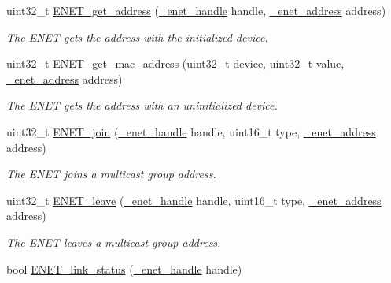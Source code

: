 \begin{DoxyCompactItemize}
uint32\+\_\+t \hyperlink{group__enet__rtcs__adaptor_gaaf87b07918a31d7ddc229a10eb7b4bf2}{E\+N\+E\+T\+\_\+get\+\_\+address} (\hyperlink{group__enet__rtcs__adaptor_gac8e61675abb18254042bf944bf122def}{\+\_\+enet\+\_\+handle} handle, \hyperlink{group__enet__rtcs__adaptor_ga82c41b61a1376f4a48ede6c89b9c4f2f}{\+\_\+enet\+\_\+address} address)
\begin{DoxyCompactList}\small\item\em The E\+N\+ET gets the address with the initialized device. \end{DoxyCompactList}\item 
uint32\+\_\+t \hyperlink{group__enet__rtcs__adaptor_ga3a7256df1fadbd18ad4c145280ab5728}{E\+N\+E\+T\+\_\+get\+\_\+mac\+\_\+address} (uint32\+\_\+t device, uint32\+\_\+t value, \hyperlink{group__enet__rtcs__adaptor_ga82c41b61a1376f4a48ede6c89b9c4f2f}{\+\_\+enet\+\_\+address} address)
\begin{DoxyCompactList}\small\item\em The E\+N\+ET gets the address with an uninitialized device. \end{DoxyCompactList}\item 
uint32\+\_\+t \hyperlink{group__enet__rtcs__adaptor_ga780f930a538bcb03d742a87d4b9d3eff}{E\+N\+E\+T\+\_\+join} (\hyperlink{group__enet__rtcs__adaptor_gac8e61675abb18254042bf944bf122def}{\+\_\+enet\+\_\+handle} handle, uint16\+\_\+t type, \hyperlink{group__enet__rtcs__adaptor_ga82c41b61a1376f4a48ede6c89b9c4f2f}{\+\_\+enet\+\_\+address} address)
\begin{DoxyCompactList}\small\item\em The E\+N\+ET joins a multicast group address. \end{DoxyCompactList}\item 
uint32\+\_\+t \hyperlink{group__enet__rtcs__adaptor_ga06c812a8547a468857ba36aeaeffc7b8}{E\+N\+E\+T\+\_\+leave} (\hyperlink{group__enet__rtcs__adaptor_gac8e61675abb18254042bf944bf122def}{\+\_\+enet\+\_\+handle} handle, uint16\+\_\+t type, \hyperlink{group__enet__rtcs__adaptor_ga82c41b61a1376f4a48ede6c89b9c4f2f}{\+\_\+enet\+\_\+address} address)
\begin{DoxyCompactList}\small\item\em The E\+N\+ET leaves a multicast group address. \end{DoxyCompactList}\item 
bool \hyperlink{group__enet__rtcs__adaptor_gac8cdc83e17cfebbd96c73ca41362210a}{E\+N\+E\+T\+\_\+link\+\_\+status} (\hyperlink{group__enet__rtcs__adaptor_gac8e61675abb18254042bf944bf122def}{\+\_\+enet\+\_\+handle} handle)

\end{DoxyCompactItemize}
